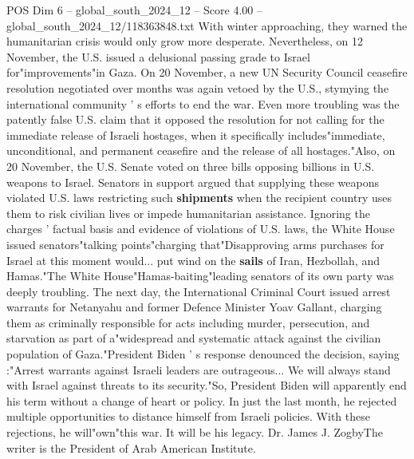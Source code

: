 \begin{textsample}{POS Dim 6 – global\_south\_2024\_12 – Score 4.00 – global\_south\_2024\_12/118363848.txt}
With winter approaching, they warned the humanitarian crisis would only grow more desperate.
Nevertheless, on 12 November, the U.S. issued a delusional passing grade to Israel for"improvements"in Gaza.
On 20 November, a new UN Security Council ceasefire resolution negotiated over months was again vetoed by the U.S., stymying the international community ' s efforts to end the war.
Even more troubling was the patently false U.S. claim that it opposed the resolution for not calling for the immediate release of Israeli hostages, when it specifically includes"immediate, unconditional, and permanent ceasefire and the release of all hostages."Also, on 20 November, the U.S.
Senate voted on three bills opposing billions in U.S. weapons to Israel.
Senators in support argued that supplying these weapons violated U.S. laws restricting such \textbf{shipments} when the recipient country uses them to risk civilian lives or impede humanitarian assistance.
Ignoring the charges ' factual basis and evidence of violations of U.S. laws, the White House issued senators"talking points"charging that"Disapproving arms purchases for Israel at this moment would... put wind on the \textbf{sails} of Iran, Hezbollah, and Hamas."The White House"Hamas-baiting"leading senators of its own party was deeply troubling.
The next day, the International Criminal Court issued arrest warrants for Netanyahu and former Defence Minister Yoav Gallant, charging them as criminally responsible for acts including murder, persecution, and starvation as part of a"widespread and systematic attack against the civilian population of Gaza."President Biden ' s response denounced the decision, saying :"Arrest warrants against Israeli leaders are outrageous...
We will always stand with Israel against threats to its security."So, President Biden will apparently end his term without a change of heart or policy.
In just the last month, he rejected multiple opportunities to distance himself from Israeli policies.
With these rejections, he will"own"this war.
It will be his legacy.
Dr.
James J.
ZogbyThe writer is the President of Arab American Institute.

\end{textsample}
